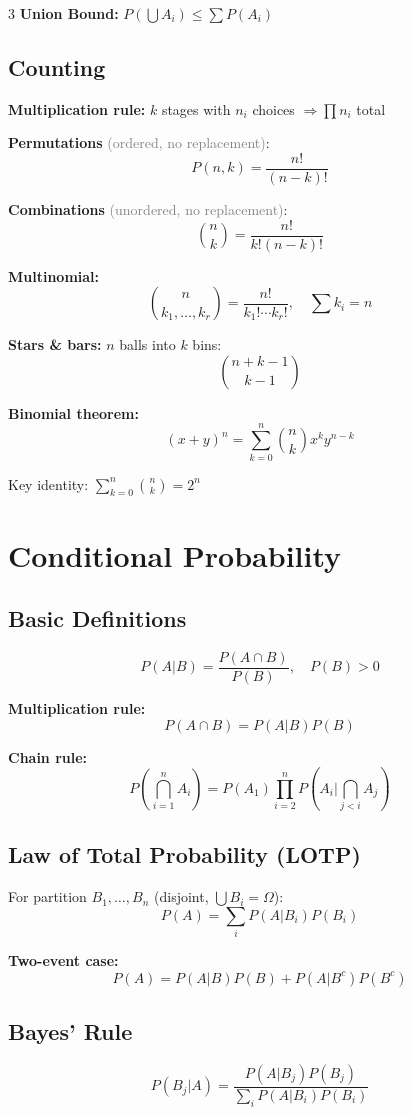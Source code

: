 \documentclass[10pt,landscape]{article}
\newcommand{\note}[1]{\textcolor{gray}{\small(#1)}}
\begin{document}
\begin{multicols}{3}
\textbf{Union Bound:} $P(\bigcup A_i) \leq \sum P(A_i)$

\subsection{Counting}
\textbf{Multiplication rule:} $k$ stages with $n_i$ choices $\Rightarrow \prod n_i$ total

\textbf{Permutations} \note{ordered, no replacement}:
$$P(n, k) = \frac{n!}{(n-k)!}$$

\textbf{Combinations} \note{unordered, no replacement}:
$$\binom{n}{k} = \frac{n!}{k!(n-k)!}$$

\textbf{Multinomial:}
$$\binom{n}{k_1, \ldots, k_r} = \frac{n!}{k_1! \cdots k_r!}, \quad \sum k_i = n$$

\textbf{Stars \& bars:} $n$ balls into $k$ bins:
$$\binom{n + k - 1}{k - 1}$$

\textbf{Binomial theorem:}
$$(x + y)^n = \sum_{k=0}^n \binom{n}{k} x^k y^{n-k}$$

Key identity: $\sum_{k=0}^n \binom{n}{k} = 2^n$

\section{Conditional Probability}

\subsection{Basic Definitions}
$$P(A|B) = \frac{P(A \cap B)}{P(B)}, \quad P(B) > 0$$

\textbf{Multiplication rule:}
$$P(A \cap B) = P(A|B)P(B)$$

\textbf{Chain rule:}
$$P(\bigcap_{i=1}^n A_i) = P(A_1) \prod_{i=2}^n P(A_i | \bigcap_{j<i} A_j)$$

\subsection{Law of Total Probability (LOTP)}
For partition $B_1, \ldots, B_n$ (disjoint, $\bigcup B_i = \Omega$):
$$P(A) = \sum_i P(A|B_i)P(B_i)$$

\textbf{Two-event case:}
$$P(A) = P(A|B)P(B) + P(A|B^c)P(B^c)$$

\subsection{Bayes' Rule}
$$P(B_j|A) = \frac{P(A|B_j)P(B_j)}{\sum_i P(A|B_i)P(B_i)}$$


\end{multicols}
\end{document}
